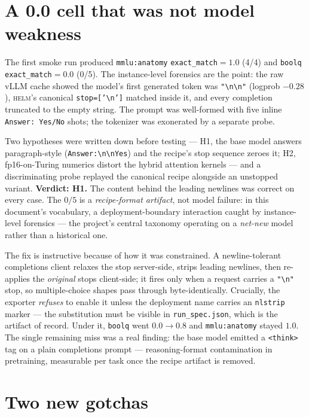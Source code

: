\documentclass[11pt]{report}
\newcommand{\code}[1]{\texttt{#1}}
\begin{document}
\section{A 0.0 cell that was not model weakness}

The first smoke run produced \code{mmlu:anatomy} \code{exact\_match}$=1.0$ (4/4) and
\code{boolq} \code{exact\_match}$=0.0$ (0/5). The instance-level forensics are the
point: the raw vLLM cache showed the model's first generated token was
\code{"\textbackslash n\textbackslash n"} (logprob $-0.28$), \textsc{helm}'s
canonical \code{stop=['\textbackslash n']} matched inside it, and every completion
truncated to the empty string. The prompt was well-formed with five inline
\code{Answer: Yes/No} shots; the tokenizer was exonerated by a separate probe.

Two hypotheses were written down before testing --- H1, the base model answers
paragraph-style (\code{Answer:\textbackslash n\textbackslash nYes}) and the recipe's
stop sequence zeroes it; H2, fp16-on-Turing numerics distort the hybrid attention
kernels --- and a discriminating probe replayed the canonical recipe alongside an
unstopped variant. \textbf{Verdict: H1.} The content behind the leading newlines was
correct on every case. The $0/5$ is a \emph{recipe-format artifact}, not model
failure: in this document's vocabulary, a deployment-boundary interaction caught by
instance-level forensics --- the project's central taxonomy operating on a
\emph{net-new} model rather than a historical one.

The fix is instructive because of how it was constrained. A newline-tolerant
completions client relaxes the stop server-side, strips leading newlines, then
re-applies the \emph{original} stops client-side; it fires only when a request
carries a \code{"\textbackslash n"} stop, so multiple-choice shapes pass through
byte-identically. Crucially, the exporter \emph{refuses} to enable it unless the
deployment name carries an \code{nlstrip} marker --- the substitution must be
visible in \code{run\_spec.json}, which is the artifact of record. Under it,
\code{boolq} went $0.0 \rightarrow 0.8$ and \code{mmlu:anatomy} stayed $1.0$. The
single remaining miss was a real finding: the base model emitted a \code{<think>}
tag on a plain completions prompt --- reasoning-format contamination in pretraining,
measurable per task once the recipe artifact is removed.

\section{Two new gotchas}
\end{document}
